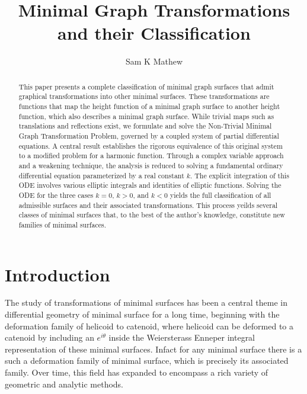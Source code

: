 \documentclass[12pt]{article}
\theoremstyle{plain}
\theoremstyle{definition}
\theoremstyle{remark}
\begin{document}
	
	\title{Minimal Graph Transformations and their Classification}
	\author{Sam K Mathew}
	\date{}
	\maketitle
	
\begin{abstract}
	This paper presents a complete classification of minimal graph surfaces that admit graphical transformations into other minimal surfaces. These transformations are functions that map the height function of a minimal graph surface to another height function, which also describes a minimal graph surface. While trivial maps such as translations and reflections exist, we formulate and solve the Non‑Trivial Minimal Graph Transformation Problem, governed by a coupled system of partial differential equations. A central result establishes the rigorous equivalence of this original system to a modified problem for a harmonic function. Through a complex variable approach and a weakening technique, the analysis is reduced to solving a fundamental ordinary differential equation parameterized by a real constant \(k\). The explicit integration of this ODE involves various elliptic integrals and identities of elliptic functions. Solving the ODE for the three cases \(k = 0\), \(k > 0\), and \(k < 0\) yields the full classification of all admissible surfaces and their associated transformations. This process yeilds several classes of minimal surfaces that, to the best of the author’s knowledge, constitute new families of minimal surfaces.
\end{abstract}
	
	\section{Introduction}
	
	 The study of transformations of minimal surfaces has been a central theme in differential geometry of minimal surface for a long time, beginning with the deformation family of helicoid to catenoid, where helicoid can be deformed to a catenoid by including an \(e^{i\theta}\) inside the Weiersterass Enneper integral representation of these minimal surfaces. Infact for any minimal surface there is a such a deformation family of minimal surface, which is precisely its associated family. Over time, this field has expanded to encompass a rich variety of geometric and analytic methods.
	 
\end{document}
